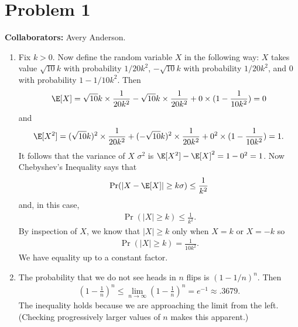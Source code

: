 \section*{Problem 1}
\textbf{Collaborators:} Avery Anderson.
\medskip

\begin{enumerate}
    \item Fix $k > 0.$ Now define the random variable $X$ in the following way:
    $X$ takes value $\sqrt{10}k$ with probability $1/20k^2$,
    $-\sqrt{10}k$ with probability $1/20k^2$,
    and 0 with probability $1-1/10k^2$.
    Then
    \begin{align}
        \E[X] = \sqrt{10}k \times \frac{1}{20k^2} - \sqrt{10}k \times \frac{1}{20k^2}
        + 0 \times (1 - \frac{1}{10k^2}) = 0
        \nonumber
    \end{align}
    and
    \begin{align}
        \E[X^2] = (\sqrt{10}k)^2 \times \frac{1}{20k^2} +
        (-\sqrt{10}k)^2 \times \frac{1}{20k^2}
        + 0^2 \times (1 - \frac{1}{10k^2}) = 1.
        \nonumber
    \end{align}
    It follows that the variance of $X$ $\sigma^2$ is
    $\E[X^2] - \E[X]^2 = 1 - 0^2 = 1$.
    Now Chebyshev's Inequality says that 
    \begin{align}
        \Pr(|X-\E[X]| \geq k \sigma) \leq \frac{1}{k^2}
        \nonumber
    \end{align}
    and, in this case, 
    \begin{align}
        \Pr(|X| \geq k) \leq \frac{1}{k^2}.
        \nonumber
    \end{align}
    By inspection of $X$, we know that $|X| \geq k$
    only when $X=k$ or $X=-k$ so
    \begin{align}
        \Pr(|X| \geq k) = \frac{1}{10k^2}.
        \nonumber
    \end{align}
    We have equality up to a constant factor.
    \qedsymbol
    
    \item The probability that we do not see heads in $n$
    flips is $(1 -1/n)^n$. Then
    \begin{align}
        (1-\frac{1}{n})^n \leq
        \lim_{n \rightarrow \infty} (1 -\frac{1}{n})^n = e^{-1} \approx 
        .3679.
        \nonumber
    \end{align}
    The inequality holds because we are approaching the limit from
    the left. (Checking progressively larger values of $n$ makes this apparent.)
    

\end{enumerate}
